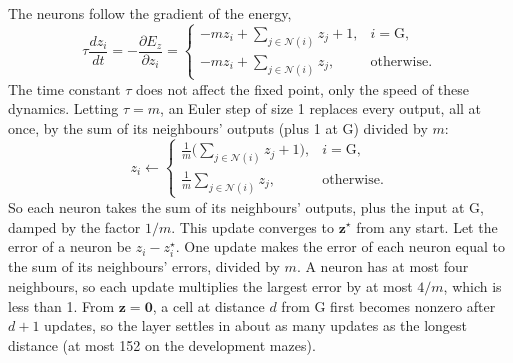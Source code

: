 \documentclass{article}
\newif\ifmathcolors
\newcommand{\role}[2]{\ifmathcolors{\color{#1}#2}\else{#2}\fi}
\newcommand{\state}[1]{\role{StateColor}{#1}}
\newcommand{\coupling}[1]{\role{CouplingColor}{#1}}
\newcommand{\vect}[1]{\boldsymbol{#1}}
\begin{document}
The neurons follow the gradient of the energy,
\begin{equation}
\tau\frac{d\state{z}_i}{dt}=-\frac{\partial E_z}{\partial\state{z}_i}=
\begin{cases}
\displaystyle-\coupling{m}\state{z}_i+\sum_{j\in\mathcal N(i)}\state{z}_j+1, & i=\mathrm G,\\[14pt]
\displaystyle-\coupling{m}\state{z}_i+\sum_{j\in\mathcal N(i)}\state{z}_j, & \text{otherwise}.
\end{cases}
\label{eq:hidden-flow}
\end{equation}
The time constant $\tau$ does not affect the fixed point, only the speed of these dynamics. 
Letting $\tau=\coupling{m}$, an Euler step of size 1 replaces every output, all at once, by the sum of its neighbours' outputs (plus 1 at G) divided by $\coupling{m}$:
\begin{equation}
\state{z}_i\leftarrow
\begin{cases}
\displaystyle\frac1{\coupling{m}}\Big(\sum_{j\in\mathcal N(i)}\state{z}_j+1\Big), & i=\mathrm G,\\[14pt]
\displaystyle\frac1{\coupling{m}}\sum_{j\in\mathcal N(i)}\state{z}_j, & \text{otherwise}.
\end{cases}
\label{eq:hidden-update}
\end{equation}
So each neuron takes the sum of its neighbours' outputs, plus the input at G, damped by the factor $1/\coupling{m}$.
This update converges to $\state{\vect z}^\star$ from any start.
Let the error of a neuron be $\state{z}_i-\state{z}^\star_i$.
One update makes the error of each neuron equal to the sum of its neighbours' errors, divided by $\coupling{m}$.
A neuron has at most four neighbours, so each update multiplies the largest error by at most $4/\coupling{m}$, which is less than 1.
From $\state{\vect z}=\vect 0$, a cell at distance $d$ from G first becomes nonzero after $d+1$ updates, so the layer settles in about as many updates as the longest distance (at most 152 on the development mazes).
\end{document}
